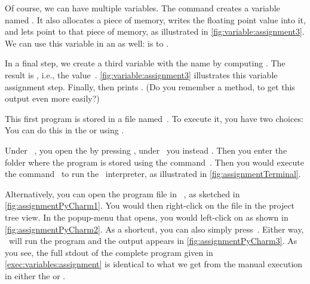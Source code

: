 Of course, we can have multiple variables.
The command  creates a variable named .
It also allocates a piece of memory, writes the floating point value  into it, and lets  point to that piece of memory, as illustrated in \cref{fig:variable:assignment3}.
We can use this variable in an  as well:
 is  to .%
%
\begin{sloppypar}%
In a final step, we create a third variable with the name  by computing .
The result is , i.e., the  value~.
\cref{fig:variable:assignment3} illustrates this variable assignment step.
Finally,  then prints .
(Do you remember a method, to get this output even more easily?)%
\end{sloppypar}%
%
This first program is stored in a file named~.
To execute it, you have two choices:
You can do this in the  or using \pycharm.%
%
\begin{sloppypar}%
Under \ubuntu\ \linux, you open the  by pressing \ubuntuTerminal, under \microsoftWindows\ you instead \windowsTerminal.
Then you enter the folder where the program  is stored using the command~.
Then you would execute the command~ to run the \python\ interpreter, as illustrated in \cref{fig:assignmentTerminal}.%
\end{sloppypar}%
%
Alternatively, you can open the program file in \pycharm\ , as sketched in \cref{fig:assignmentPyCharm1}.
You would then right-click on the file  in the project tree view.
In the popup-menu that opens, you would left-click on  as shown in \cref{fig:assignmentPyCharm2}.
As a shortcut, you can also simply press~.
Either way, \pycharm\ will run the program and the output appears in \cref{fig:assignmentPyCharm3}.
As you see, the full \acrfull{stdout} of the complete program given in \cref{exec:variables:assignment} is identical to what we get from the manual execution in either the  or \pycharm.

